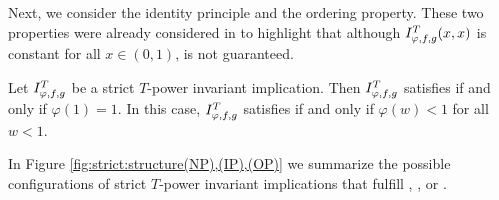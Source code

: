 Next, we consider the identity principle and the ordering property. These two properties were already considered in \cite{Massanet2019B} to highlight that although $I^T_{\varphi,f,g}(x,x)$ is constant for all $x \in (0,1)$, \IP is not guaranteed.
\begin{proposition}\label{prop:strict:(IP)n(OP)} Let $I^T_{\varphi,f,g}$ be a strict $T$-power invariant implication. Then $I^T_{\varphi,f,g}$ satisfies \IP if and only if $\varphi(1)=1$. In this case, $I^T_{\varphi,f,g}$ satisfies \OP if and only if $\varphi(w)<1$ for all $w<1$.
\end{proposition}
In Figure \ref{fig:strict:structure(NP),(IP),(OP)} we summarize the possible configurations of strict $T$-power invariant implications that fulfill \NP, \NPe, \IP or \OP.
